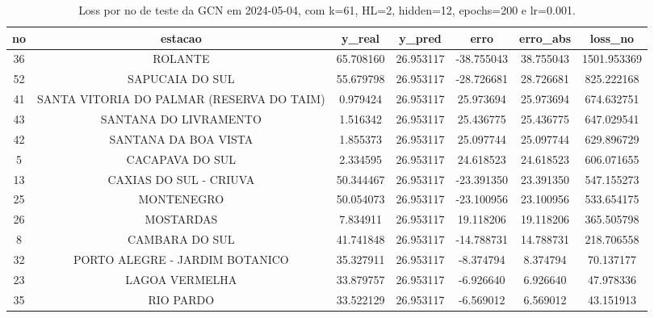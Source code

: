 \begin{table}[h]
\centering
\caption{Loss por no de teste da GCN em 2024-05-04, com k=61, HL=2, hidden=12, epochs=200 e lr=0.001.}
\label{tab:gcn_loss_k61_hl2_h12_e200_d20240504}
\begin{tabular}{ccccccc}
\toprule
no & estacao & y\_real & y\_pred & erro & erro\_abs & loss\_no \\
\midrule
36 & ROLANTE & 65.708160 & 26.953117 & -38.755043 & 38.755043 & 1501.953369 \\
52 & SAPUCAIA DO SUL & 55.679798 & 26.953117 & -28.726681 & 28.726681 & 825.222168 \\
41 & SANTA VITORIA DO PALMAR (RESERVA DO TAIM) & 0.979424 & 26.953117 & 25.973694 & 25.973694 & 674.632751 \\
43 & SANTANA DO LIVRAMENTO & 1.516342 & 26.953117 & 25.436775 & 25.436775 & 647.029541 \\
42 & SANTANA DA BOA VISTA & 1.855373 & 26.953117 & 25.097744 & 25.097744 & 629.896729 \\
5 & CACAPAVA DO SUL & 2.334595 & 26.953117 & 24.618523 & 24.618523 & 606.071655 \\
13 & CAXIAS DO SUL - CRIUVA & 50.344467 & 26.953117 & -23.391350 & 23.391350 & 547.155273 \\
25 & MONTENEGRO & 50.054073 & 26.953117 & -23.100956 & 23.100956 & 533.654175 \\
26 & MOSTARDAS & 7.834911 & 26.953117 & 19.118206 & 19.118206 & 365.505798 \\
8 & CAMBARA DO SUL & 41.741848 & 26.953117 & -14.788731 & 14.788731 & 218.706558 \\
32 & PORTO ALEGRE - JARDIM BOTANICO & 35.327911 & 26.953117 & -8.374794 & 8.374794 & 70.137177 \\
23 & LAGOA VERMELHA & 33.879757 & 26.953117 & -6.926640 & 6.926640 & 47.978336 \\
35 & RIO PARDO & 33.522129 & 26.953117 & -6.569012 & 6.569012 & 43.151913 \\
\bottomrule
\end{tabular}
\end{table}
